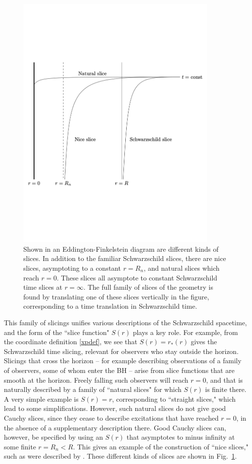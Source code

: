 \documentclass[12pt]{article}
\numberwithin{equation}{section}
\begin{document}
\begin{figure}[!hbtp] \begin{center}
\includegraphics[width=10cm]{fig1.pdf}
\end{center}
\caption{Shown in an Eddington-Finkelstein diagram are different kinds of slices. In addition to the familiar Schwarzschild slices, there are nice slices, asymptoting to a constant $r=R_n$, and natural slices which reach $r=0$.  These slices all asymptote to constant Schwarzschild time slices at $r=\infty$.  The full family of slices of the geometry is found by translating one of these slices vertically in the figure, corresponding to a time translation in Schwarzschild time.}
\label{Figslices}
\end{figure} 



This family of slicings unifies various descriptions of the Schwarzschild spacetime, and the form of the ``slice function" $S(r)$ plays a key role.  For example, from the coordinate definition \eqref{xpdef}, we see that $S(r)=r_*(r)$ gives the Schwarzschild time slicing, relevant for observers who stay outside the horizon.  Slicings that cross the horizon -- for example describing observations of a family of observers, some of whom enter the BH -- arise from slice functions that are smooth at the horizon.  Freely falling such observers will reach $r=0$, and that is naturally described by a family of ``natural slices" for which $S(r)$ is finite there.  A very simple example is $S(r)=r$, corresponding to ``straight slices,"  which lead to some simplifications.  However, such natural slices do not give good Cauchy slices, since they cease to describe excitations that have reached $r=0$, in the absence of a supplementary description there.  Good Cauchy slices can, however, be specified by using an $S(r)$ that asymptotes to minus infinity at some finite $r=R_n<R$.  This gives an example of the construction of ``nice slices," such as were described by \cite{Waldnice,LPSTU}.  These different kinds of slices are shown in Fig.~\ref{Figslices}.
\end{document}
